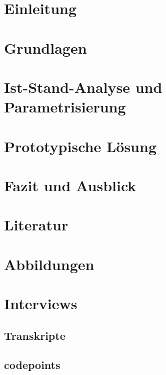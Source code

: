 \documentclass[headings=small,a4paper,12pt,oneside]{scrreprt}
\begin{document}
\singlespacing

\maketitle

\singlespacing
\tableofcontents
\restoregeometry

\singlespacing
\chapter{Einleitung}


\singlespacing 
\chapter{Grundlagen}


\singlespacing
\chapter{Ist-Stand-Analyse und Parametrisierung}


\singlespacing 
\chapter{Prototypische Lösung}


\singlespacing 
\chapter{Fazit und Ausblick}


\singlespacing 
\appendix
\chapter{Literatur}

\chapter{Abbildungen}

\chapter{Interviews}
\section{Transkripte}
\section{codepoints}
\end{document}
